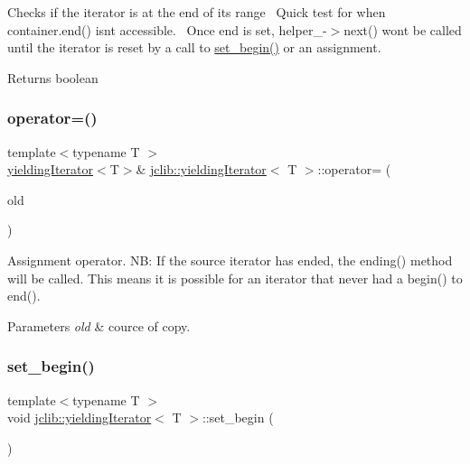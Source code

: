 Checks if the iterator is at the end of its range~\newline
 Quick test for when container.\+end() isn\textquotesingle{}t accessible.~\newline
 Once end is set, helper\+\_\+-\/$>$next() won\textquotesingle{}t be called until the iterator is reset by a call to \hyperlink{classjclib_1_1yieldingIterator_af6051397c336c96df0a31895b2f125ab}{set\+\_\+begin()} or an assignment. \begin{DoxyReturn}{Returns}
boolean 
\end{DoxyReturn}
\mbox{\label{classjclib_1_1yieldingIterator_adf46d4f19267c7cc52bc3b5cd814dd42}} 
\subsubsection{\texorpdfstring{operator=()}{operator=()}}
{\footnotesize\ttfamily template$<$typename T $>$ \\
\hyperlink{classjclib_1_1yieldingIterator}{yielding\+Iterator}$<$T$>$\& \hyperlink{classjclib_1_1yieldingIterator}{jclib\+::yielding\+Iterator}$<$ T $>$\+::operator= (\begin{DoxyParamCaption}\item[{const \hyperlink{classjclib_1_1yieldingIterator}{yielding\+Iterator}$<$ T $>$ \&}]{old }\end{DoxyParamCaption})\hspace{0.3cm}{\ttfamily [inline]}}

Assignment operator. NB\+: If the source iterator has ended, the ending() method will be called. This means it is possible for an iterator that never had a begin() to end(). 
\begin{DoxyParams}{Parameters}
{\em old} & cource of copy. \\
\hline
\end{DoxyParams}
\mbox{\label{classjclib_1_1yieldingIterator_af6051397c336c96df0a31895b2f125ab}} 
\subsubsection{\texorpdfstring{set\+\_\+begin()}{set\_begin()}}
{\footnotesize\ttfamily template$<$typename T $>$ \\
void \hyperlink{classjclib_1_1yieldingIterator}{jclib\+::yielding\+Iterator}$<$ T $>$\+::set\+\_\+begin (\begin{DoxyParamCaption}{ }\end{DoxyParamCaption})\hspace{0.3cm}{\ttfamily [inline]}}

